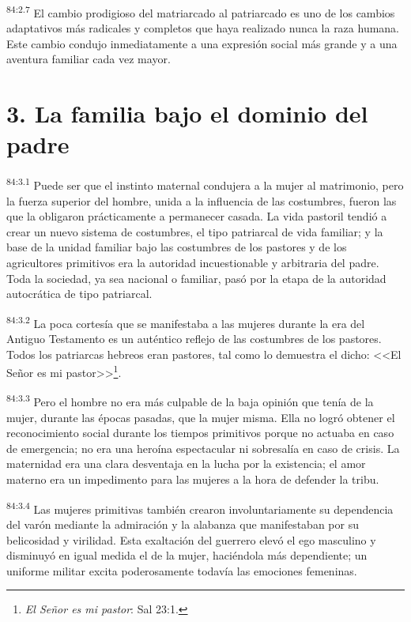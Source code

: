 \documentclass[twoside, 11pt]{book}
\begin{document}
\par
\textsuperscript{84:2.7} El cambio prodigioso del matriarcado al patriarcado es uno de los cambios adaptativos más radicales y completos que haya realizado nunca la raza humana. Este cambio condujo inmediatamente a una expresión social más grande y a una aventura familiar cada vez mayor.

\section*{3. La familia bajo el dominio del padre}
\par
\textsuperscript{84:3.1} Puede ser que el instinto maternal condujera a la mujer al matrimonio, pero la fuerza superior del hombre, unida a la influencia de las costumbres, fueron las que la obligaron prácticamente a permanecer casada. La vida pastoril tendió a crear un nuevo sistema de costumbres, el tipo patriarcal de vida familiar; y la base de la unidad familiar bajo las costumbres de los pastores y de los agricultores primitivos era la autoridad incuestionable y arbitraria del padre. Toda la sociedad, ya sea nacional o familiar, pasó por la etapa de la autoridad autocrática de tipo patriarcal.

\par
\textsuperscript{84:3.2} La poca cortesía que se manifestaba a las mujeres durante la era del Antiguo Testamento es un auténtico reflejo de las costumbres de los pastores. Todos los patriarcas hebreos eran pastores, tal como lo demuestra el dicho: <<El Señor es mi pastor>>\footnote{\textit{El Señor es mi pastor}: Sal 23:1.}.

\par
\textsuperscript{84:3.3} Pero el hombre no era más culpable de la baja opinión que tenía de la mujer, durante las épocas pasadas, que la mujer misma. Ella no logró obtener el reconocimiento social durante los tiempos primitivos porque no actuaba en caso de emergencia; no era una heroína espectacular ni sobresalía en caso de crisis. La maternidad era una clara desventaja en la lucha por la existencia; el amor materno era un impedimento para las mujeres a la hora de defender la tribu.

\par
\textsuperscript{84:3.4} Las mujeres primitivas también crearon involuntariamente su dependencia del varón mediante la admiración y la alabanza que manifestaban por su belicosidad y virilidad. Esta exaltación del guerrero elevó el ego masculino y disminuyó en igual medida el de la mujer, haciéndola más dependiente; un uniforme militar excita poderosamente todavía las emociones femeninas.
\end{document}
